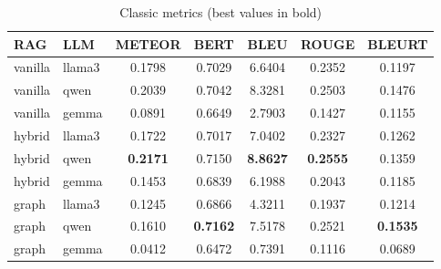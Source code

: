 
\begin{table}[ht]
\centering
\scriptsize
\begin{tabular}{llccccc}
\toprule
RAG & LLM & METEOR & BERT & BLEU & ROUGE & BLEURT \\
\midrule

vanilla & llama3 & 0.1798 & 0.7029 & 6.6404 & 0.2352 & 0.1197 \\
vanilla & qwen & 0.2039 & 0.7042 & 8.3281 & 0.2503 & 0.1476 \\
vanilla & gemma & 0.0891 & 0.6649 & 2.7903 & 0.1427 & 0.1155 \\
hybrid & llama3 & 0.1722 & 0.7017 & 7.0402 & 0.2327 & 0.1262 \\
hybrid & qwen & \textbf{0.2171} & 0.7150 & \textbf{8.8627} & \textbf{0.2555} & 0.1359 \\
hybrid & gemma & 0.1453 & 0.6839 & 6.1988 & 0.2043 & 0.1185 \\
graph & llama3 & 0.1245 & 0.6866 & 4.3211 & 0.1937 & 0.1214 \\
graph & qwen & 0.1610 & \textbf{0.7162} & 7.5178 & 0.2521 & \textbf{0.1535} \\
graph & gemma & 0.0412 & 0.6472 & 0.7391 & 0.1116 & 0.0689 \\

\bottomrule
\end{tabular}
\caption{Classic metrics (best values in bold)}
\end{table}
